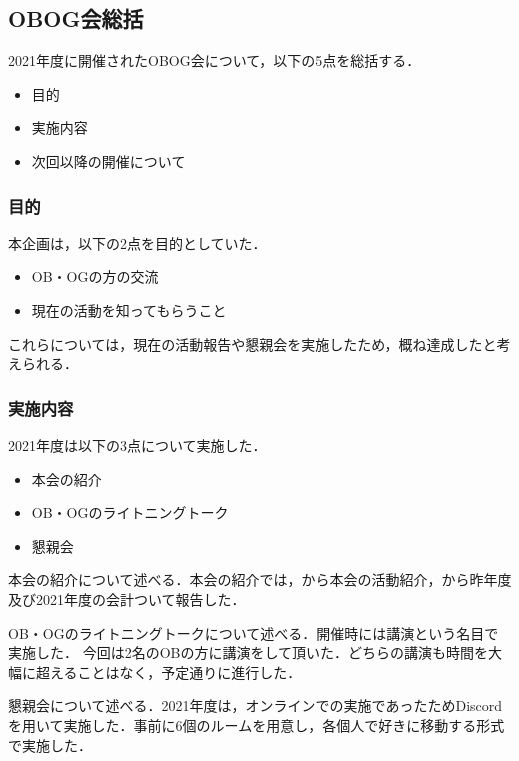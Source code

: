 \subsection*{OBOG会総括}


2021年度に開催されたOBOG会について，以下の5点を総括する．
\begin{itemize}
    \item 目的
    \item 実施内容
    \item 次回以降の開催について
\end{itemize}

\subsubsection*{目的}

本企画は，以下の2点を目的としていた．

\begin{itemize}
    \item OB・OGの方の交流
    \item 現在の活動を知ってもらうこと
\end{itemize}

これらについては，現在の活動報告や懇親会を実施したため，概ね達成したと考えられる．

\subsubsection*{実施内容}

2021年度は以下の3点について実施した．

\begin{itemize}
    \item 本会の紹介
    \item OB・OGのライトニングトーク
	\item 懇親会
\end{itemize}

本会の紹介について述べる．本会の紹介では，\president{}から本会の活動紹介，\kaikeiChief{}から昨年度及び2021年度の会計ついて報告した．

OB・OGのライトニングトークについて述べる．開催時には講演という名目で実施した．
今回は2名のOBの方に講演をして頂いた．どちらの講演も時間を大幅に超えることはなく，予定通りに進行した．

懇親会について述べる．2021年度は，オンラインでの実施であったためDiscordを用いて実施した．事前に6個のルームを用意し，各個人で好きに移動する形式で実施した．
